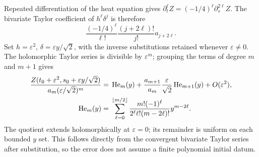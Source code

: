 Repeated differentiation of the heat equation gives
$\partial_t^\ell Z=(-1/4)^\ell\partial_s^{2\ell}Z$.
The bivariate Taylor coefficient of $h^\ell\delta^j$ is therefore
\[
 \frac{(-1/4)^\ell}{\ell!}\frac{(j+2\ell)!}{j!}
 a_{j+2\ell}.
\]
Set $h=\varepsilon^2$, $\delta=\varepsilon y/\sqrt2$, with the
inverse substitutions retained whenever $\varepsilon\ne0$.
The holomorphic Taylor series is divisible by $\varepsilon^m$;
grouping the terms of degree $m$ and $m+1$ gives
\begin{align}
 \frac{Z(t_0+\varepsilon^2,s_0+\varepsilon y/\sqrt2)}
      {a_m(\varepsilon/\sqrt2)^m}
 ={}&\operatorname{He}_m(y)
 +\frac{a_{m+1}}{a_m}\frac{\varepsilon}{\sqrt2}
              \operatorname{He}_{m+1}(y)+O(\varepsilon^2),\notag\\
 \operatorname{He}_m(y)={}&
 \sum_{\ell=0}^{\lfloor m/2\rfloor}
 \frac{m!(-1)^\ell}{2^\ell\ell!(m-2\ell)!}y^{m-2\ell}.
 \label{eq:zt-all-multiplicity}
\end{align}
The quotient extends holomorphically at $\varepsilon=0$; its
remainder is uniform on each bounded $y$ set.  This follows directly
from the convergent bivariate Taylor series after substitution, so
the error does not assume a finite polynomial initial datum.

